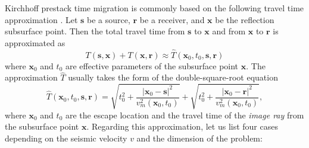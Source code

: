 Kirchhoff prestack time migration is commonly based on the following
travel time approximation \cite[]{yilmaz}. Let $\mathbf{s}$ be a
source, $\mathbf{r}$ be a receiver, and $\mathbf{x}$ be the reflection
subsurface point. Then the total travel time from $\mathbf{s}$ to
$\mathbf{x}$ and from $\mathbf{x}$ to $\mathbf{r}$ is approximated as
\begin{equation}
\label{tsxr}
T(\mathbf{s},\mathbf{x})+T(\mathbf{x},\mathbf{r})
\approx\hat{T}(\mathbf{x}_0,t_0,\mathbf{s},\mathbf{r})
\end{equation}
where $\mathbf{x}_0$ and $t_0$ are effective parameters 
of the subsurface point $\mathbf{x}$. The approximation $\hat{T}$ 
usually takes the form of the double-square-root equation
\begin{equation}
\label{ttappr}
\hat{T}(\mathbf{x}_0,t_0,\mathbf{s},\mathbf{r})=
\sqrt{t_0^2+\frac{|\mathbf{x}_0-\mathbf{s}|^2}{v_m^2(\mathbf{x}_0,t_0)}}+
\sqrt{t_0^2+\frac{|\mathbf{x}_0-\mathbf{r}|^2}{v_m^2(\mathbf{x}_0,t_0)}},
\end{equation}
where $\mathbf{x}_0$ and $t_0$ are the escape location and the travel
time of the \emph{image ray} \cite[]{hubral1977} from the subsurface point
$\mathbf{x}$.  Regarding this approximation, let us list four cases
depending on the seismic velocity $v$ and the dimension of the
problem:

